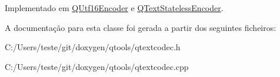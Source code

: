 Implementado em \hyperlink{class_q_utf16_encoder_a9a52118940f62558cfbf17d859aaa03e}{Q\-Utf16\-Encoder} e \hyperlink{class_q_text_stateless_encoder_a51f5637ed532d48c4397214510501e2b}{Q\-Text\-Stateless\-Encoder}.



A documentação para esta classe foi gerada a partir dos seguintes ficheiros\-:\begin{DoxyCompactItemize}
\item 
C\-:/\-Users/teste/git/doxygen/qtools/qtextcodec.\-h\item 
C\-:/\-Users/teste/git/doxygen/qtools/qtextcodec.\-cpp\end{DoxyCompactItemize}
